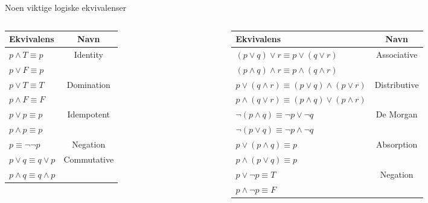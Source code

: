 \begin{frame}{Noen viktige logiske ekvivalenser}
    \begin{columns}
    \begin{column}{0.32\textwidth}
        \begin{tabular}{l|c}
        Ekvivalens & Navn \\ \hline
        $p \land T \equiv p$ & Identity\\
        $p \lor F \equiv p$ \\ \hline
        
        $p \lor T \equiv T$ & Domination\\
        $p \land F \equiv F$\\ \hline
        
        $p \lor p \equiv p$ & Idempotent\\
        $p \land p \equiv p$ \\ \hline
        
        $p \equiv \lnot \lnot p$ & Negation\\ \hline
        
        $p \lor q \equiv q \lor p$ & Commutative\\
        $p \land q \equiv q \land p$ \\
        

    \end{tabular}
    \end{column}
    \begin{column}{0.52\textwidth}
        \begin{tabular}{l|c}
        Ekvivalens & Navn \\ \hline
        
        $(p \lor q) \lor r \equiv p \lor (q \lor r)$ & Associative\\
        $(p \land q) \land r \equiv p \land (q \land r)$ \\ \hline
        
        $p \lor (q \land r) \equiv (p \lor q) \land (p \lor r)$ & Distributive\\
        $p \land (q \lor r) \equiv (p \land q) \lor (p \land r)$ \\ \hline
        
        $\lnot (p \land q) \equiv \lnot p \lor \lnot q$ & De Morgan \\
        $\lnot (p \lor q) \equiv \lnot p \land \lnot q$ \\ \hline
        
        $p \lor (p \land q) \equiv p$ & Absorption \\
        $p \land (p \lor q) \equiv p$ \\ \hline
        
        $p \lor \lnot p \equiv T$ & Negation \\
        $p \land \lnot p \equiv F$ \\
        \end{tabular}
    \end{column}
\end{columns}
\end{frame}

